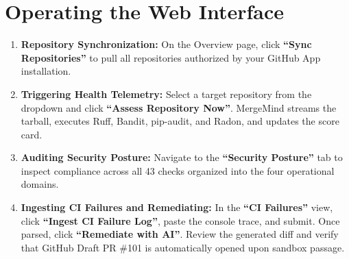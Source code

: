 \documentclass[12pt,a4paper,oneside]{report}
\begin{document}
\section{Operating the Web Interface}

\begin{enumerate}
    \item \textbf{Repository Synchronization:} On the Overview page, click \textbf{``Sync Repositories''} to pull all repositories authorized by your GitHub App installation.
    \item \textbf{Triggering Health Telemetry:} Select a target repository from the dropdown and click \textbf{``Assess Repository Now''}. MergeMind streams the tarball, executes Ruff, Bandit, pip-audit, and Radon, and updates the score card.
    \item \textbf{Auditing Security Posture:} Navigate to the \textbf{``Security Posture''} tab to inspect compliance across all 43 checks organized into the four operational domains.
    \item \textbf{Ingesting CI Failures and Remediating:} In the \textbf{``CI Failures''} view, click \textbf{``Ingest CI Failure Log''}, paste the console trace, and submit. Once parsed, click \textbf{``Remediate with AI''}. Review the generated diff and verify that GitHub Draft PR \#101 is automatically opened upon sandbox passage.
\end{enumerate}

\cleardoublepage
\end{document}

